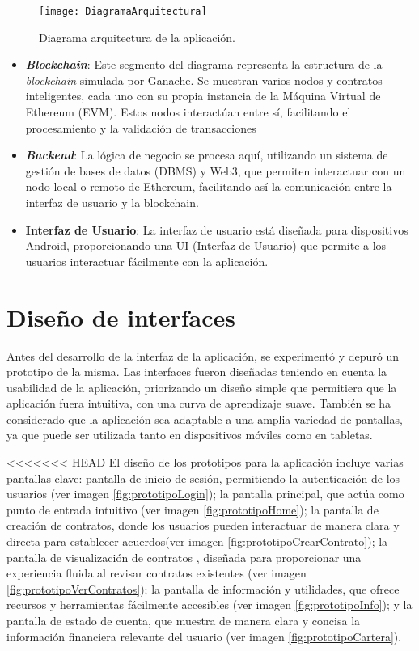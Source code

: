 \begin{figure}[h]
	\centering
	\texttt{[image: DiagramaArquitectura]}
	\caption[Diagrama arquitectura]{Diagrama arquitectura de la aplicación.}
	\label{fig:DiagramaArquitectura}
\end{figure}

\begin{itemize}
\item \textbf{\textit{Blockchain}}: Este segmento del diagrama representa la estructura de la \textit{blockchain} simulada por Ganache. Se muestran varios nodos y contratos inteligentes, cada uno con su propia instancia de la Máquina Virtual de Ethereum (EVM). Estos nodos interactúan entre sí, facilitando el procesamiento y la validación de transacciones

\item \textbf{\textit{Backend}}: La lógica de negocio se procesa aquí, utilizando un sistema de gestión de bases de datos (DBMS) y Web3, que permiten interactuar con un nodo local o remoto de Ethereum, facilitando así la comunicación entre la interfaz de usuario y la blockchain.

\item \textbf{Interfaz de Usuario}: La interfaz de usuario está diseñada para dispositivos Android, proporcionando una UI (Interfaz de Usuario) que permite a los usuarios interactuar fácilmente con la aplicación.
\end{itemize}

\section{Diseño de interfaces}

Antes del desarrollo de la interfaz de la aplicación, se experimentó y depuró un prototipo de la misma.
Las interfaces fueron diseñadas teniendo en cuenta la usabilidad de la aplicación, priorizando un diseño simple que permitiera que la aplicación fuera intuitiva, con una curva de aprendizaje suave.
También se ha considerado que la aplicación sea adaptable a una amplia variedad de pantallas, ya que puede ser utilizada tanto en dispositivos móviles como en tabletas.

<<<<<<< HEAD
El diseño de los prototipos para la aplicación incluye varias pantallas clave: pantalla de inicio de sesión, permitiendo la autenticación de los usuarios (ver imagen \ref{fig:prototipoLogin}); la pantalla principal, que actúa como punto de entrada intuitivo (ver imagen \ref{fig:prototipoHome}); la pantalla de creación de contratos, donde los usuarios pueden interactuar de manera clara y directa para establecer acuerdos(ver imagen \ref{fig:prototipoCrearContrato}); la pantalla de visualización de contratos , diseñada para proporcionar una experiencia fluida al revisar contratos existentes (ver imagen \ref{fig:prototipoVerContratos}); la pantalla de información y utilidades, que ofrece recursos y herramientas fácilmente accesibles (ver imagen \ref{fig:prototipoInfo}); y la pantalla de estado de cuenta, que muestra de manera clara y concisa la información financiera relevante del usuario (ver imagen \ref{fig:prototipoCartera}). 

